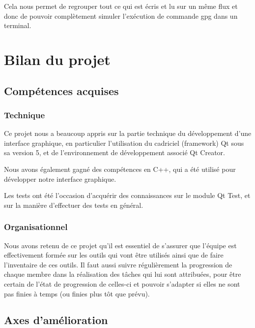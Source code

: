 \documentclass{../res/univ-projet}
\begin{document}
      Cela nous permet de regrouper tout ce qui est écris et lu sur un même flux et donc de pouvoir
      complètement simuler l'exécution de commande gpg dans un terminal.
  

\section{Bilan du projet}
  
  \subsection{Compétences acquises}

    \subsubsection{Technique}
    
      Ce projet nous a beaucoup appris sur la partie technique du développement d'une interface graphique, en particulier l'utilisation du cadriciel (framework) Qt sous sa version 5, et de l'environnement de développement associé Qt Creator.

      Nous avons également gagné des compétences en C++, qui a été utilisé pour développer notre interface graphique.

      Les tests ont été l'occasion d'acquérir des connaissances sur le module Qt Test, et sur la manière d'effectuer des tests en général.



    \subsubsection{Organisationnel}

      Nous avons retenu de ce projet qu'il est essentiel de s'assurer que l'équipe est effectivement formée sur les outils qui vont être utilisés ainsi que de faire l'inventaire de ces outils.
      Il faut aussi suivre régulièrement la progression de chaque membre dans la réalisation des tâches qui lui sont attribuées, pour être certain de l'état de progression de celles-ci et pouvoir s'adapter si elles ne sont pas finies à temps (ou finies plus tôt que prévu).




  \subsection{Axes d'amélioration}
  
\end{document}
